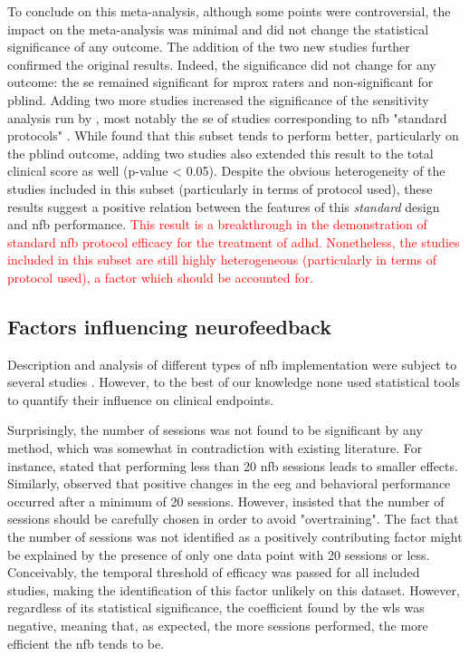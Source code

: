 To conclude on this meta-analysis, although some points were controversial, the impact on the
meta-analysis was minimal and did not change the statistical significance of any outcome. 
The addition of the two new studies \citep{Strehl2017, Baumeister2016} further confirmed the original results. Indeed, the
significance did not change for any outcome: the \gls{se} remained significant for \gls{mprox} raters and
non-significant for \gls{pblind}. Adding two more studies increased the significance of the sensitivity analysis run by
\citeauthor{Cortese2016}, most notably the \gls{se} of studies corresponding to \gls{nfb} "standard protocols" \citep{Arns2014}. 
While \citeauthor{Cortese2016} found that this subset tends to perform better, particularly on the \gls{pblind} outcome, 
adding two studies also extended this result to the total clinical score as well (p-value < 0.05). Despite the obvious heterogeneity 
of the studies included in this subset (particularly in terms of protocol used), these results suggest a positive relation 
between the features of this \emph{standard} design and \gls{nfb} performance. \textcolor{red}{This result is a breakthrough in the demonstration 
of standard \gls{nfb} protocol efficacy for the treatment of \gls{adhd}. Nonetheless, the  studies 
included in this subset are still highly heterogeneous (particularly in terms of protocol used), a factor which should be accounted for.}


\subsection{Factors influencing neurofeedback}

Description and analysis of different types of \gls{nfb} implementation were subject to several studies \citep{Arns2014, 
Enriquez2017, Vernon2004, Jeunet2018}. However, to the best of our knowledge none used statistical tools to quantify their influence on
clinical endpoints. 

Surprisingly, the number of sessions was not found to be significant by any method, which was somewhat
in contradiction with existing literature. For instance, \citet{Arns2014} stated that performing less than
20 \gls{nfb} sessions leads to smaller effects. Similarly, \citet{Vernon2004} observed that positive changes in the \gls{eeg}
and behavioral performance occurred after a minimum of 20 sessions. However, \citet{Enriquez2017} insisted that the number of
sessions should be carefully chosen in order to avoid "overtraining". The fact that the number of sessions was not identified as a 
positively contributing factor might be explained by the presence of only one data point with 20 sessions or less. Conceivably, 
the temporal threshold of efficacy was passed for all included studies, making the identification of this factor unlikely on 
this dataset. However, regardless of its statistical significance, the coefficient found by the \gls{wls} was negative, meaning 
that, as expected, the more sessions performed, the more efficient the \gls{nfb} tends to be. 

